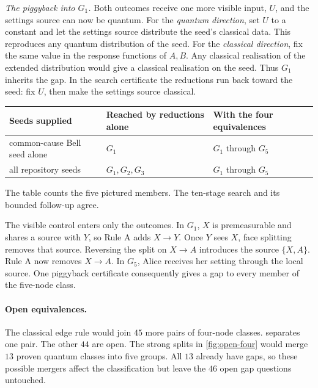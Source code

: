 \emph{The piggyback into $G_1$.} Both outcomes receive one more visible input, $U$, and the settings source can
now be quantum. For the \emph{quantum direction}, set $U$ to a constant and let the settings source distribute
the seed's classical data. This reproduces any quantum distribution of the seed. For the
\emph{classical direction}, fix the same value in the response functions of $A,B$. Any classical realisation
of the extended distribution would give a classical realisation on the seed. Thus $G_1$ inherits the gap.
In the search certificate the reductions run back toward the seed: fix $U$, then make the settings source classical.

\begin{center}
\small
\begin{tabular}{@{}lll@{}}
\toprule
Seeds supplied & Reached by reductions alone & With the four equivalences\\
\midrule
common-cause Bell seed alone & $G_1$ & $G_1$ through $G_5$\\
all repository seeds & $G_1,G_2,G_3$ & $G_1$ through $G_5$\\
\bottomrule
\end{tabular}
\end{center}

The table counts the five pictured members. The ten-stage search and its bounded follow-up agree.

The visible control enters only the outcomes. In $G_1$, $X$ is premeasurable and shares a source
with $Y$, so Rule A adds $X\to Y$. Once $Y$ sees $X$, face splitting removes that source.
Reversing the split on $X\to A$ introduces the source $\{X,A\}$. Rule A now removes $X\to A$.
In $G_5$, Alice receives her setting through the local source. One piggyback
certificate consequently gives a gap to every member of the five-node class.

\paragraph{Open equivalences.}\label{sec:open-summary}
The classical edge rule would join $45$ more pairs of four-node classes.  separates
one pair. The other $44$ are open. The strong splits in \cref{fig:open-four} would merge $13$ proven quantum classes into five groups. All $13$ already have gaps, so these possible mergers affect the classification but leave the
$46$ open gap questions untouched.

